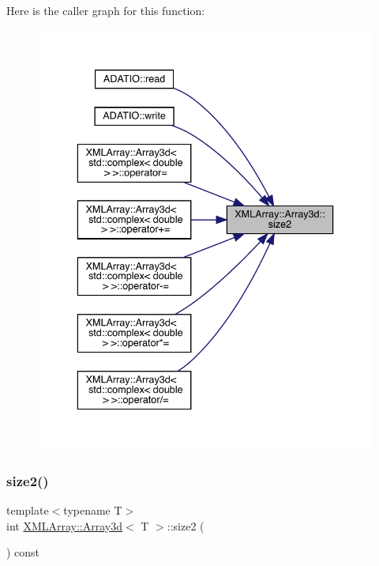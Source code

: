Here is the caller graph for this function\+:
\nopagebreak
\begin{figure}[H]
\begin{center}
\leavevmode
\includegraphics[width=336pt]{db/da0/classXMLArray_1_1Array3d_a1ea00a28e916b3fd9102ce7057c02dac_icgraph}
\end{center}
\end{figure}
\mbox{\label{classXMLArray_1_1Array3d_a1ea00a28e916b3fd9102ce7057c02dac}} 
\subsubsection{\texorpdfstring{size2()}{size2()}\hspace{0.1cm}{\footnotesize\ttfamily [3/3]}}
{\footnotesize\ttfamily template$<$typename T$>$ \\
int \mbox{\hyperlink{classXMLArray_1_1Array3d}{X\+M\+L\+Array\+::\+Array3d}}$<$ T $>$\+::size2 (\begin{DoxyParamCaption}{ }\end{DoxyParamCaption}) const\hspace{0.3cm}{\ttfamily [inline]}}

